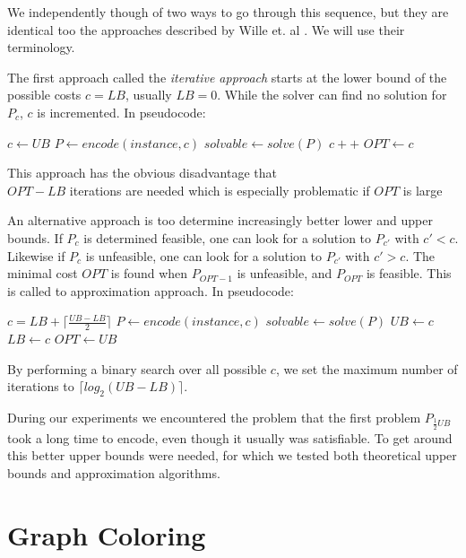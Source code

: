 \documentclass{sig-alternate}
\newcommand{\mli}[1]{\mathit{#1}}
\begin{document}
We independently though of two ways to go through this sequence, but they are identical too the approaches described by Wille et. al \cite{wille2008using}.
We will use their terminology.

The first approach called the \emph{iterative approach} starts at the lower bound of the possible costs $c = \mli{LB}$, usually $\mli{LB} = 0$.
While the solver can find no solution for $P_c$, $c$ is incremented.
In pseudocode:

\begin{algorithmic}
\State $c \gets \mli{UB}$
	\State $P \gets encode(instance, c)$
	\State $solvable \gets solve(P)$
		\State $c++$
	\EndIf
\EndWhile
\State $\mli{OPT} \gets c$
\end{algorithmic}

This approach has the obvious disadvantage that \\ $\mli{OPT}-\mli{LB}$ iterations are needed which is especially problematic if $\mli{OPT}$ is large

An alternative approach is too determine increasingly better lower and upper bounds.
If $P_c$ is determined feasible, one can look for a solution to $P_{c'}$ with $c' < c$. Likewise if $P_c$ is unfeasible, one can look for a solution to $P_{c'}$ with $c' > c$.
The minimal cost $OPT$ is found when $P_{OPT-1}$ is unfeasible, and $P_{\mli{OPT}}$ is feasible. This is called to approximation approach.
In pseudocode:

\begin{algorithmic}
\While {$\mli{LB} \neq \mli{UB} - 1$}
	\State $c = \mli{LB} + \lceil \frac{\mli{UB} - \mli{LB}}{2} \rceil$
	\State $P \gets encode(instance, c)$
	\State $solvable \gets solve(P)$
		\State $\mli{UB} \gets c$
	\Else
		\State $\mli{LB} \gets c$
	\EndIf
\EndWhile
\State $\mli{OPT} \gets \mli{UB}$
\end{algorithmic}

By performing a binary search over all possible $c$, we set the maximum number of iterations to $\lceil log_2(\mli{UB}-\mli{LB}) \rceil$.

During our experiments we encountered the problem that the first problem $P_{\frac{1}{2}\mli{UB}}$ took a long time to encode, even though it usually was satisfiable.
To get around this better upper bounds were needed, for which we tested both theoretical upper bounds and approximation algorithms.

\newpage

\section{Graph Coloring}
\label{sec:graph_coloring}
\end{document}
